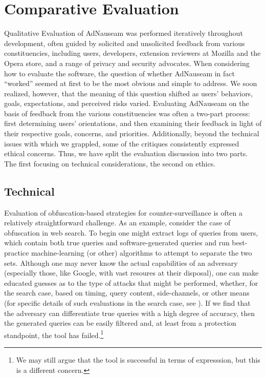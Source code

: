 \documentclass[conference]{IEEEtran}
\begin{document}
\section{Comparative Evaluation}

Qualitative Evaluation of AdNauseam was performed iteratively throughout development, often guided by solicited and unsolicited feedback from various constituencies, including users, developers, extension reviewers at Mozilla and the Opera store, and a range of privacy and security advocates. When considering how to evaluate the software, the question of whether AdNauseam in fact “worked” seemed at first to be the most obvious and simple to address. We soon realized, however, that the meaning of this question shifted as users' behaviors, goals, expectations, and perceived risks varied. Evaluating AdNauseam on the basis of feedback from the various constituencies was often a two-part process: first determining users' orientations, and then examining their feedback in light of their respective goals, concerns, and priorities. Additionally, beyond the technical issues with which we grappled, some of the critiques consistently expressed ethical concerns. Thus, we have split the evaluation discussion into two parts. The first focusing on technical considerations, the second on ethics.


\subsection{Technical}

Evaluation of obfuscation-based strategies for counter-surveillance is often a relatively straightforward challenge. As an example, consider the case of obfuscation in web search. To begin one might extract logs of queries from users, which contain both true queries and software-generated queries and run best-practice machine-learning (or other) algorithms to attempt to separate the two sets. Although one may never know the actual capabilities of an adversary (especially those, like Google, with vast resoures at their disposal), one can make educated guesses as to the type of attacks that might be performed, whether, for the search case, based on timing, query content, side-channels, or other means (for specific details of such evaluations in the search case, see \cite{Gervais,Balsa,Peddinti}).  If we find that the adversary can differentiate true queries with a high degree of accuracy, then the generated queries can be easily filtered  and, at least from a protection standpoint, the tool has failed.\footnote{We may still argue that the tool is successful in terms of expresssion, but this is a different concern.}
\end{document}
